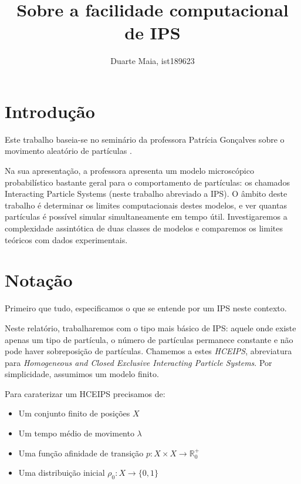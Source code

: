 \documentclass{article}
\title{Sobre a facilidade computacional de IPS}
\author{Duarte Maia, ist189623}
\date{}
\newcommand{\R}{\mathbb{R}}
\begin{document}
	\maketitle

	\section{Introdução}

	Este trabalho baseia-se no seminário da professora Patrícia Gonçalves sobre o movimento aleatório de partículas \cite{pat}. 
	
	Na sua apresentação, a professora apresenta um modelo microscópico probabilístico bastante geral para o comportamento de partículas: os chamados Interacting Particle Systems (neste trabalho abreviado a IPS). O âmbito deste trabalho é determinar os limites computacionais destes modelos, e ver quantas partículas é possível simular simultaneamente em tempo útil. Investigaremos a complexidade assintótica de duas classes de modelos e comparemos os limites teóricos com dados experimentais.

	\section{Notação}

	Primeiro que tudo, especificamos o que se entende por um IPS neste contexto.
	
	Neste relatório, trabalharemos com o tipo mais básico de IPS: aquele onde existe apenas um tipo de partícula, o número de partículas permanece constante e não pode haver sobreposição de partículas. Chamemos a estes \emph{HCEIPS}, abreviatura para \emph{Homogeneous and Closed Exclusive Interacting Particle Systems}. Por simplicidade, assumimos um modelo finito.
	
	Para caraterizar um HCEIPS precisamos de:
	
	\begin{itemize}
	\item Um conjunto finito de posições $X$
	
	\item Um tempo médio de movimento $\lambda$
	
	\item Uma função afinidade de transição $p : X \times X \rightarrow \R^+_0$
	
	\item Uma distribuição inicial $\rho_0 : X \rightarrow \{0,1\}$
	\end{itemize}
	
\end{document}
